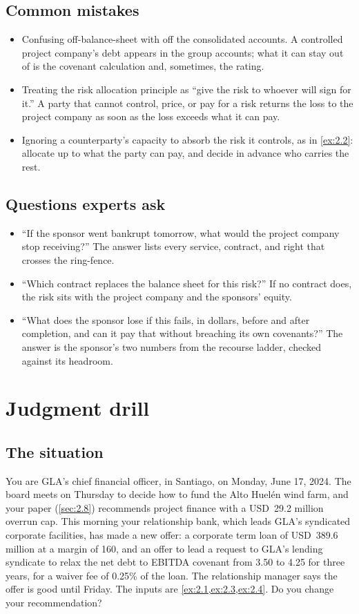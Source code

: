 \subsection*{Common mistakes}
\begin{itemize}
\item Confusing off-balance-sheet with off the consolidated accounts. A controlled project company's debt appears in the group accounts; what it can stay out of is the covenant calculation and, sometimes, the rating.
\item Treating the risk allocation principle as ``give the risk to whoever will sign for it.'' A party that cannot control, price, or pay for a risk returns the loss to the project company as soon as the loss exceeds what it can pay.
\item Ignoring a counterparty's capacity to absorb the risk it controls, as in \cref{ex:2.2}: allocate up to what the party can pay, and decide in advance who carries the rest.
\end{itemize}

\subsection*{Questions experts ask}
\begin{itemize}
\item ``If the sponsor went bankrupt tomorrow, what would the project company stop receiving?'' The answer lists every service, contract, and right that crosses the ring-fence.
\item ``Which contract replaces the balance sheet for this risk?'' If no contract does, the risk sits with the project company and the sponsors' equity.
\item ``What does the sponsor lose if this fails, in dollars, before and after completion, and can it pay that without breaching its own covenants?'' The answer is the sponsor's two numbers from the recourse ladder, checked against its headroom.
\end{itemize}

\section{Judgment drill}\label{sec:2.11}

\subsection*{The situation}
You are GLA's chief financial officer, in Santiago, on Monday, June 17, 2024. The board meets on Thursday to decide how to fund the Alto Huelén wind farm, and your paper (\cref{sec:2.8}) recommends project finance with a USD~29.2 million overrun cap. This morning your relationship bank, which leads GLA's syndicated corporate facilities, has made a new offer: a corporate term loan of USD~389.6 million at a margin of 160\bps, and an offer to lead a request to GLA's lending syndicate to relax the net debt to EBITDA covenant from 3.50\x{} to 4.25\x{} for three years, for a waiver fee of 0.25\% of the loan. The relationship manager says the offer is good until Friday. The inputs are \cref{ex:2.1,ex:2.3,ex:2.4}. Do you change your recommendation?

